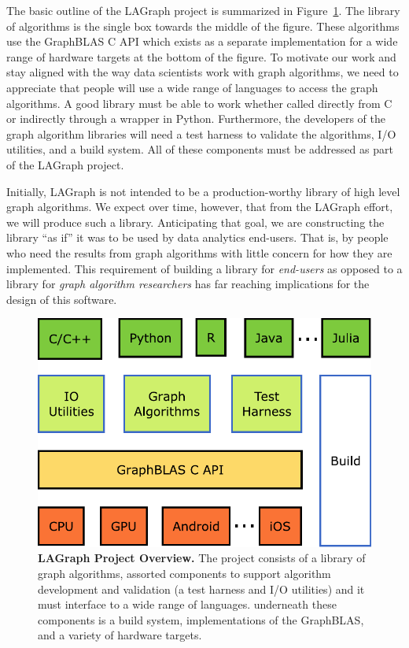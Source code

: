 The basic outline of the LAGraph project  is summarized in 
Figure~\ref{fig:overview}. The library of algorithms is the single box towards
the middle of the figure.  These algorithms use the GraphBLAS C API
which exists as a separate implementation for a wide range of hardware
targets at the bottom of the figure.  To motivate our work and stay aligned 
with the way data scientists work with graph algorithms, we need to appreciate that
people will use a wide range of languages to access the graph algorithms.  A good library
must be able to work whether called directly from C or indirectly through a wrapper in Python.
Furthermore, the developers of the graph algorithm libraries will need a test harness to
validate the algorithms, I/O utilities, and a build system.  All of these components must
be addressed as part of the LAGraph project. 

Initially, LAGraph is not intended to be a production-worthy library of 
high level graph algorithms.  We expect over time, however, that from the LAGraph 
effort, we will produce such a library.  Anticipating that goal, we are constructing
the library ``as if'' it was to be used by data analytics end-users. That is, by people
who need the results from graph algorithms with little concern for how they are
implemented.  This requirement of building a library for \emph{end-users} as opposed to 
a library for \emph{graph algorithm researchers} has far reaching implications for the 
design of this software.

\begin{figure}[t]
	\includegraphics[width=\linewidth]{fig/lagraph}
	\caption{\textbf{LAGraph Project Overview.} The project consists of a library of 
	graph algorithms, assorted components to support algorithm development and validation
	(a test harness and I/O utilities) and it must interface to a wide range of languages.
	underneath these components is a build system, implementations of the GraphBLAS, 
	and a variety of hardware targets. \label{fig:overview}}
\end{figure}

